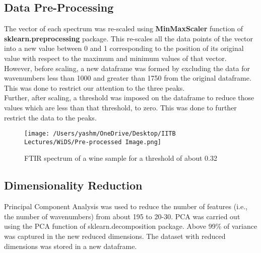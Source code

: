 \documentclass{article}
\begin{document}
\subsection{Data Pre-Processing}
The vector of each spectrum was re-scaled using \textbf{MinMaxScaler} function of \textbf{sklearn.preprocessing} package. This re-scales all the data points of the vector into a new value between 0 and 1 corresponding to the position of its original value with respect to the maximum and minimum values of that vector.\\
\newline
However, before scaling, a new dataframe was formed by excluding the data for wavenumbers less than 1000 and greater than 1750 from the original dataframe. This was done to restrict our attention to the three peaks.\\
\newline
Further, after scaling, a threshold was imposed on the dataframe to reduce those values which are less than that threshold, to zero. This was done to further restrict the data to the peaks.\\
\begin{figure}[H]
	\centering
	\texttt{[image: /Users/yashm/OneDrive/Desktop/IITB Lectures/WiDS/Pre-processed Image.png]}
	\caption[Optional Caption]{FTIR spectrum of a wine sample for a threshold of about 0.32}
	\label{fig:fig2}
\end{figure}

\subsection{Dimensionality Reduction}
Principal Component Analysis was used to reduce the number of features (i.e., the number of wavenumbers) from about 195 to 20-30. PCA was carried out using the PCA function of sklearn.decomposition package. Above 99\% of variance was captured in the new reduced dimensions. The dataset with reduced dimensions was stored in a new dataframe.\\
\newpage
\end{document}
